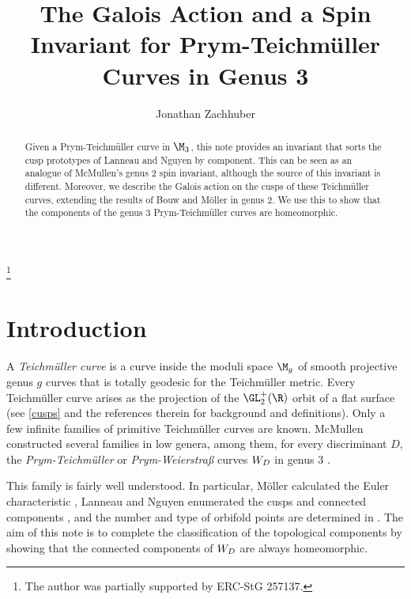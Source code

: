 \documentclass{amsart}
\begin{document}
\title[Galois Action and Spin in Genus 3]{The Galois Action and a Spin Invariant for Prym-Teichmüller Curves in Genus 3}
\author{Jonathan Zachhuber}
\thanks{The author was partially supported by ERC-StG 257137.}
\address{FB 12 -- Institut für Mathematik\\Johann Wolfgang Goethe-Universität\\Robert-Mayer-Str. 6--8\\D-60325 Frankfurt am Main}

\begin{abstract}
Given a Prym-Teichmüller curve in $\M_3$, this note provides an invariant that sorts the cusp prototypes of Lanneau and Nguyen by component. This 
can be seen as an analogue of McMullen's genus $2$ spin invariant, although the source of this invariant is different.
Moreover, we describe the Galois action on the cusps of these Teichmüller curves, extending the results of Bouw and Möller in genus $2$. We use this to show that the components of the genus $3$ Prym-Teichmüller curves are homeomorphic.
\end{abstract}
\maketitle

\tableofcontents

\section{Introduction}

A \emph{Teichmüller curve} is a curve inside the moduli space $\M_g$ of smooth projective genus $g$ curves that is totally geodesic for the Teichmüller metric. Every Teichmüller curve arises as the projection of the $\GL_2^+(\R)$ orbit of a flat surface (see \autoref{cusps} and the references therein for background and definitions). Only a few infinite families of primitive Teichmüller curves are known. McMullen constructed several families in low genera, among them, for every discriminant $D$, the \emph{Prym-Teichmüller} or \emph{Prym-Weierstraß} curves $\W$ in genus $3$ \cite{mcmullenprym}.

This family is fairly well understood. In particular, Möller calculated the Euler characteristic \cite{moellerprym}, Lanneau and Nguyen enumerated the cusps and connected components \cite{lanneaunguyen}, and the number and type of orbifold points are determined in \cite{TTZ}. The aim of this note is to complete the classification of the topological components by showing that the connected components of $\W$ are always homeomorphic.
\end{document}
